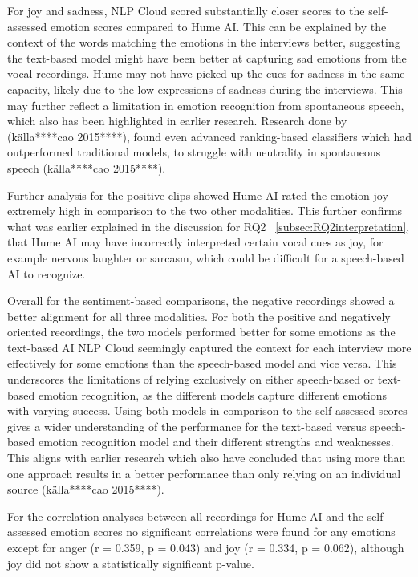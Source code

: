 For joy and sadness, NLP Cloud scored substantially closer scores to the self-assessed emotion scores compared to Hume AI. This can be explained by the context of the words matching the emotions in the interviews better, suggesting the text-based model might have been better at capturing sad emotions from the vocal recordings. Hume may not have picked up the cues for sadness in the same capacity, likely due to the low expressions of sadness during the interviews. This may further reflect a limitation in emotion recognition from spontaneous speech, which also has been highlighted in earlier research. Research done by (källa****cao 2015****), found even advanced ranking-based classifiers which had outperformed traditional models, to struggle with neutrality in spontaneous speech (källa****cao 2015****).  

Further analysis for the positive clips showed Hume AI rated the emotion joy extremely high in comparison to the two other modalities. This further confirms what was earlier explained in the discussion for RQ2 ~\ref{subsec:RQ2interpretation}, that Hume AI may have incorrectly interpreted certain vocal cues as joy, for example nervous laughter or sarcasm, which could be difficult for a speech-based AI to recognize.

Overall for the sentiment-based comparisons, the negative recordings showed a better alignment for all three modalities. For both the positive and negatively oriented recordings, the two models performed better for some emotions as the text-based AI NLP Cloud seemingly captured the context for each interview more effectively for some emotions than the speech-based model and vice versa. This underscores the limitations of relying exclusively on either speech-based or text-based emotion recognition, as the different models capture different emotions with varying success. Using both models in comparison to the self-assessed scores gives a wider understanding of the performance for the text-based versus speech-based emotion recognition model and their different strengths and weaknesses. This aligns with earlier research which also have concluded that using more than one approach results in a better performance than only relying on an individual source (källa****cao 2015****).

For the correlation analyses between all recordings for Hume AI and the self-assessed emotion scores no significant correlations were found for any emotions except for anger (r = 0.359, p = 0.043) and joy (r = 0.334, p = 0.062), although joy did not show a statistically significant p-value. 

